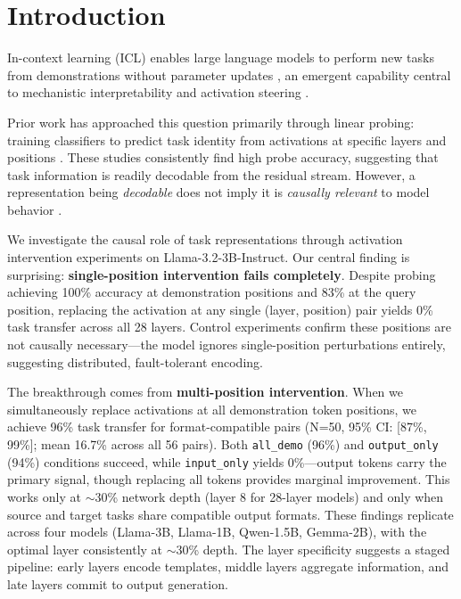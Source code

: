 \documentclass[11pt]{article}
\begin{document}
\section{Introduction}
\label{sec:intro}

In-context learning (ICL) enables large language models to perform new tasks from demonstrations without parameter updates \citep{brown2020language,garg2022can}, an emergent capability \citep{wei2022emergent} central to mechanistic interpretability and activation steering \citep{turner2023activation}.

Prior work has approached this question primarily through linear probing: training classifiers to predict task identity from activations at specific layers and positions \citep{todd2023function,hendel2023context}. These studies consistently find high probe accuracy, suggesting that task information is readily decodable from the residual stream. However, a representation being \emph{decodable} does not imply it is \emph{causally relevant} to model behavior \citep{ravfogel2020null,elazar2021amnesic}.

We investigate the causal role of task representations through activation intervention experiments on Llama-3.2-3B-Instruct. Our central finding is surprising: \textbf{single-position intervention fails completely}. Despite probing achieving 100\% accuracy at demonstration positions and 83\% at the query position, replacing the activation at any single (layer, position) pair yields 0\% task transfer across all 28 layers. Control experiments confirm these positions are not causally necessary---the model ignores single-position perturbations entirely, suggesting distributed, fault-tolerant encoding.

The breakthrough comes from \textbf{multi-position intervention}. When we simultaneously replace activations at all demonstration token positions, we achieve 96\% task transfer for format-compatible pairs (N=50, 95\% CI: [87\%, 99\%]; mean 16.7\% across all 56 pairs). Both \texttt{all\_demo} (96\%) and \texttt{output\_only} (94\%) conditions succeed, while \texttt{input\_only} yields 0\%---output tokens carry the primary signal, though replacing all tokens provides marginal improvement. This works only at $\sim$30\% network depth (layer 8 for 28-layer models) and only when source and target tasks share compatible output formats. These findings replicate across four models (Llama-3B, Llama-1B, Qwen-1.5B, Gemma-2B), with the optimal layer consistently at $\sim$30\% depth. The layer specificity suggests a staged pipeline: early layers encode templates, middle layers aggregate information, and late layers commit to output generation.
\end{document}

